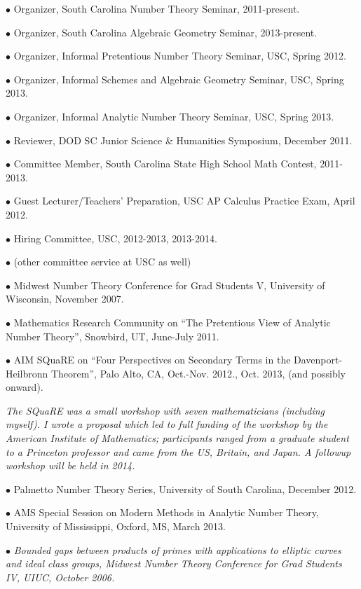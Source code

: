 \documentclass{article}
\newcommand{\categorywidth}{1in}        %
\newcommand{\categorysep}{5pt}
\newcommand{\catlistlabel}[1]%
{\raisebox{0pt}[1ex][0pt]{\makebox[\labelwidth][l]%
    {\parbox[t]{\labelwidth}{\hspace{0pt}\textbf{#1}}}}}
\newenvironment{categories}{\begin{list}{}{
      \setlength{\labelwidth}{\categorywidth}
      \setlength{\leftmargin}{\labelwidth}
      \addtolength{\leftmargin}{\labelsep}
      \setlength{\topsep}{20pt}
      \setlength{\itemsep}{\categorysep}
      \renewcommand{\makelabel}{\catlistlabel}
      }}{\end{list}}
\newcommand{\category}[1]{\item[#1]}
\begin{document}
\begin{flushleft}
\begin{categories}
{$\bullet$ Organizer, South Carolina Number Theory Seminar, 2011-present.

$\bullet$ Organizer, South Carolina Algebraic Geometry Seminar, 2013-present.

$\bullet$ Organizer, Informal Pretentious Number Theory Seminar, USC, Spring 2012.

$\bullet$ Organizer, Informal Schemes and Algebraic Geometry Seminar, USC, Spring 2013.

$\bullet$ Organizer, Informal Analytic Number Theory Seminar, USC, Spring 2013.

$\bullet$ Reviewer, DOD SC Junior Science \& Humanities Symposium, December 2011.

$\bullet$ Committee Member, South Carolina State High School Math Contest, 2011-2013.

$\bullet$ Guest Lecturer/Teachers' Preparation, USC AP Calculus Practice Exam, April 2012.

$\bullet$ Hiring Committee, USC, 2012-2013, 2013-2014.

$\bullet$ (other committee service at USC as well)

\category{Conferences Organized}

$\bullet$ Midwest Number Theory Conference for Grad Students V, University of Wisconsin, November 2007.

$\bullet$ Mathematics Research Community on ``The Pretentious View of Analytic Number Theory'', Snowbird, UT, June-July 2011.

$\bullet$ AIM SQuaRE on ``Four Perspectives on Secondary Terms in the Davenport-Heilbronn Theorem'', Palo Alto, CA, Oct.-Nov. 2012., Oct. 2013, (and possibly onward).

{\itshape The SQuaRE was a small workshop with seven mathematicians (including myself). I wrote a proposal which led to full funding
of the workshop by the American Institute of Mathematics; 
participants ranged from a graduate student to a Princeton professor and came from the US, Britain, and Japan. A followup workshop
will be held in 2014.}

$\bullet$ Palmetto Number Theory Series, University of South Carolina, December 2012.

$\bullet$ AMS Special Session on Modern Methods in Analytic Number Theory, University of Mississippi, Oxford, MS, March 2013.

\category{Research Talks}

$\bullet$ {\itshape Bounded gaps between products of primes with applications to elliptic curves
and ideal class groups, Midwest Number Theory Conference for Grad Students IV\upshape, UIUC, October 2006.}

}
\end{categories}
\end{flushleft}
\end{document}
